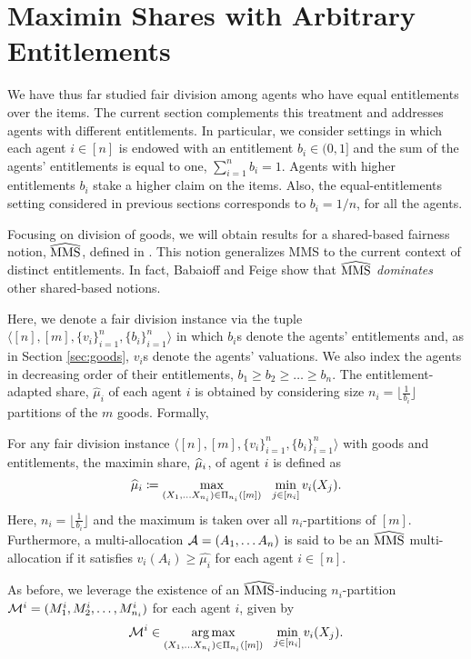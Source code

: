 \section{Maximin Shares with Arbitrary Entitlements}
\label{section:entitlements}
We have thus far studied fair division among agents who have equal entitlements over the items. The current section complements this treatment and addresses agents with different entitlements. In particular, we consider settings in which each agent $i \in [n]$ is endowed with an entitlement $b_i \in (0,1]$ and the sum of the agents' entitlements is equal to one, $\sum_{i=1}^n b_i = 1$. Agents with higher entitlements $b_i$ stake a higher claim on the items. Also, the equal-entitlements setting considered in previous sections corresponds to $b_i = 1/n$, for all the agents. 


Focusing on division of goods, we will obtain results for a shared-based fairness notion, $\mmshat$, defined in \cite{Babaioff2024ShareBasedFF}. This notion generalizes MMS to the current context of distinct entitlements. In fact, Babaioff and Feige \cite{Babaioff2024ShareBasedFF} show that $\mmshat$ \emph{dominates} other shared-based notions.   

Here, we denote a fair division instance via the tuple $\langle [n], [m], \{v_i\}_{i=1}^n, \{b_i\}_{i=1}^n \rangle$ in which $b_i$s denote the agents' entitlements and, as in Section \ref{sec:goods}, $v_i$s denote the agents' valuations. We also index the agents in decreasing order of their entitlements, $b_1 \geq b_2 \geq \ldots \geq b_n$. The entitlement-adapted share, $\widehat{\mu}_i$ of each agent $i$ is obtained by considering size $n_i = \lfloor \frac{1}{b_i} \rfloor$ partitions of the $m$ goods. Formally,  
\begin{definition}[$\mmshat$] For any fair division instance $\langle [n], [m], \{v_i\}_{i=1}^n, \{b_i\}_{i=1}^n \rangle$ with goods and entitlements, the maximin share, $\widehat{\mu}_i$, of agent $i$ is defined as
$$\widehat{\mu}_i \coloneqq  \max_{(X_1, \ldots X_{n_i})\in \Pi_{n_i}([m])} \ \ \min_{j \in [n_i]} v_i(X_j). $$
Here, $n_i=\lfloor\frac{1}{b_i}\rfloor$ and the maximum is taken over all $n_i$-partitions of $[m]$. Furthermore, a multi-allocation $\mathcal{A} = (A_1, \ldots A_n)$ is said to be an $\mmshat$ multi-allocation if it satisfies $v_i(A_i) \geq \widehat{\mu_i}$ for each agent $i \in [n]$. \\
\end{definition}

As before, we leverage the existence of an $\mmshat$-inducing $n_i$-partition $\mathcal{M}^i=(M^i_1, M^i_2, \dots, M^i_{n_i})$ for each agent $i$, given by $$\mathcal{M}^i \in \operatorname*{arg\,max}_{(X_1, \ldots X_{n_i})\in \Pi_{n_i}([m])} \ \  \min_{j \in [n_i]} v_i(X_j).$$

